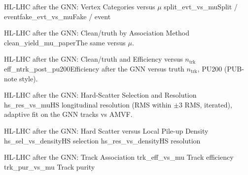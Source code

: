 \begin{frame}{HL-LHC after the GNN: Vertex Categories versus $\mu$}
\mainbadge
{}%
{split_evt_vs_mu}{Split / event}{fake_evt_vs_mu}{Fake / event}
\end{frame}

\begin{frame}{HL-LHC after the GNN: Clean/truth by Association Method}
\mainbadge
{}%
{clean_yield_mu_paper}{The same versus $\mu$.}
\par\vspace{.2em}{\footnotesize Truth-guided: each track goes to the PV-Finder candidate nearest its true vertex (MC only), the best any association can do on these peaks.}
\end{frame}

\begin{frame}{HL-LHC after the GNN: Clean/truth and Efficiency versus $n_\mathrm{trk}$}
\mainbadge
{}%
{eff_ntrk_post_pu200}{Efficiency after the GNN versus truth $n_\mathrm{trk}$, PU200 (PUB-note style).}
\end{frame}

\begin{frame}{HL-LHC after the GNN: Hard-Scatter Selection and Resolution}
\mainbadge
{}%
{hs_res_vs_mu}{HS longitudinal resolution (RMS within $\pm3$ RMS, iterated), adaptive fit on the GNN tracks vs AMVF.}
\end{frame}

\begin{frame}{HL-LHC after the GNN: Hard Scatter versus Local Pile-up Density}
\mainbadge
{}%
{hs_sel_vs_density}{HS selection}%
{hs_res_vs_density}{HS resolution}
\par\vspace{.3em}{\footnotesize Density: truth vertices within $\pm2$ mm of the true HS, HS excluded, per mm (ITk). All $\mu$, r16443 entries 0--24,999.}
\end{frame}

\begin{frame}{HL-LHC after the GNN: Track Association}
%
{trk_eff_vs_mu}{\backupbadge{} Track efficiency}%
{trk_pur_vs_mu}{\backupbadge{} Track purity}
\par{}
\end{frame}

